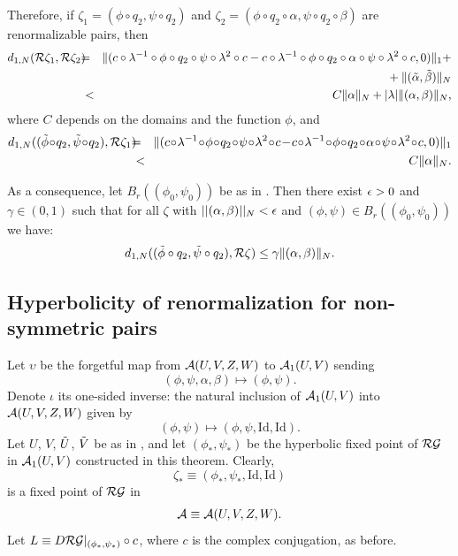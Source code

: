 Therefore, if  $\zeta_1=(\phi \circ q_2, \psi \circ q_2)$ and $\zeta_2=(\phi \circ q_2 \circ \alpha, \psi \circ q_2 \circ \beta)$ are renormalizable  pairs, then
\begin{eqnarray}
\nonumber d_{1,N}(\cR \zeta_1,\cR \zeta_2)\!\! & \!\! = \!\! & \!\! \|(c \circ \lambda^{-1} \circ \phi \circ q_2 \circ \psi \circ \lambda^2 \circ c   -  c \circ \lambda^{-1} \circ \phi \circ q_2 \circ \alpha \circ \psi \circ \lambda^2 \circ c  ,0)\|_1+\\ 
\nonumber &\phantom{=}&\phantom{\!\! \|(c \circ \lambda^{-1} \circ \phi \circ q_2 \circ \psi \circ \lambda^2 \circ c}+\|(\tilde{\alpha},\tilde{\beta})\|_N \\
 \label{eqnren1} & <& C \| \alpha \|_N +|\lambda| \|(\alpha,\beta) \|_N,
\end{eqnarray}
where $C$ depends on the domains and the function $\phi$, and
\begin{eqnarray}\label{eq:lambdaNnorm1}
\nonumber d_{1,N}((\tilde{\phi} \! \circ \! q_2,\tilde{\psi} \! \circ \! q_2) ,\cR \zeta_1 )\!\!&\!\!=\!\!&\!\! \|(c \! \circ \! \lambda^{-1} \!  \circ \!  \phi \!  \circ  \! q_2 \! \circ \! \psi \! \circ \!   \lambda^2 \!  \circ \! c   \! - \! c \!  \circ \!  \lambda^{-1} \!  \circ \!  \phi \!  \circ \!  q_2 \! \circ \!  \alpha \!   \circ \!  \psi \!  \circ \!  \lambda^2 \!  \circ  \!  c,0)\|_1  \\
\nonumber &<& C \| \alpha \|_N.
\end{eqnarray}

As a consequence, let $B_r((\phi_0,\psi_0))$ be as in . Then there exist $\epsilon>0$ and $\gamma\in(0,1)$ such that  for all $\zeta$ with $||(\alpha,\beta)||_{N}<\epsilon$ and $(\phi,\psi) \in B_r((\phi_0,\psi_0))$ we have:
\begin{equation}\label{eq:lambdaNnorm2}
d_{1,N}((\tilde{\phi} \circ q_2,\tilde{\psi} \circ q_2),\mathcal{R} \zeta) \le \gamma \|(\alpha,\beta)\|_N.
\end{equation}


\subsection{Hyperbolicity of renormalization for non-symmetric pairs}
Let $\upsilon$ be the forgetful map from $\mathcal{A}(U,V,Z,W)$ to $\mathcal{A}_1(U,V)$ sending
$$(\phi,\psi,\alpha,\beta)\mapsto (\phi,\psi).$$
Denote $\iota$ its one-sided inverse: the natural inclusion of $\mathcal{A}_1(U,V)$ into $\mathcal{A}(U,V,Z,W)$ given by
$$(\phi,\psi)\mapsto(\phi,\psi,\text{Id},\text{Id}).$$
Let $U$, $V$, $\tilde U$, $\tilde V$  be as in , and let $(\phi_*,\psi_*)$ be the hyperbolic fixed point of $\mathcal{RG}$ in
$\mathcal{A}_1(U,V)$ constructed in this theorem. 
Clearly, 
$$\zeta_*\equiv (\phi_*,\psi_*,\text{Id},\text{Id})$$
is a fixed point of $\mathcal{RG}$ in 
$$\mathcal{A}\equiv \mathcal{A}(U,V,Z,W).$$
Let  $L\equiv  D \mathcal{RG}|_{(\phi_*,\psi_*)} \circ c$, where $c$ is the complex conjugation, as before.

